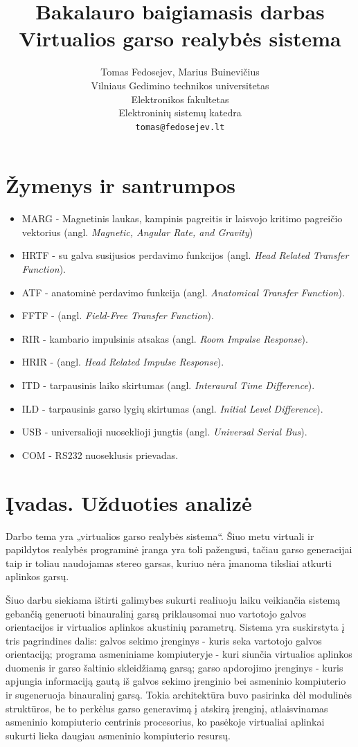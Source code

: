 \documentclass[]{vgtuef}
\author{Tomas Fedosejev, Marius Buinevičius\\Vilniaus Gedimino technikos
  universitetas\\Elektronikos fakultetas\\Elektroninių sistemų
  katedra\\\texttt{tomas@fedosejev.lt}}
\title{Bakalauro baigiamasis darbas\\Virtualios garso realybės sistema}
\begin{document}
\setcounter{page}{7}
\onehalfspacing

\tableofcontents


\section*{Žymenys ir santrumpos}

\begin{itemize}
\item MARG - Magnetinis laukas, kampinis pagreitis ir laisvojo kritimo pagreičio vektorius (angl. \textit{Magnetic, Angular Rate, and Gravity})
\item HRTF - su galva susijusios perdavimo funkcijos (angl. \textit{Head Related Transfer Function}).
\item ATF - anatominė perdavimo funkcija (angl. \textit{Anatomical Transfer Function}).
\item FFTF - (angl. \textit{Field-Free Transfer Function}).
\item RIR - kambario impulsinis atsakas (angl. \textit{Room Impulse Response}).
\item HRIR - (angl. \textit{Head Related Impulse Response}).
\item ITD - tarpausinis laiko skirtumas (angl. \textit{Interaural Time Difference}).
\item ILD - tarpausinis garso lygių skirtumas (angl. \textit{Initial Level Difference}).
\item USB - universalioji nuoseklioji jungtis (angl. \textit{Universal Serial Bus}).
\item COM - RS232 nuoseklusis prievadas.

\end{itemize}

\section{Įvadas. Užduoties analizė}

Darbo tema yra „virtualios garso realybės sistema“. Šiuo metu virtuali ir papildytos realybės programinė įranga yra toli pažengusi, tačiau garso generacijai taip ir toliau naudojamas stereo garsas, kuriuo nėra įmanoma tiksliai atkurti aplinkos garsų.

Šiuo darbu siekiama ištirti galimybes sukurti realiuoju laiku veikiančia sistemą gebančią generuoti binauralinį garsą priklausomai nuo vartotojo galvos orientacijos ir virtualios aplinkos akustinių parametrų. Sistema yra suskirstyta į tris pagrindines dalis: galvos sekimo įrenginys - kuris seka vartotojo galvos orientaciją; programa asmeniniame kompiuteryje - kuri siunčia virtualios aplinkos duomenis ir garso šaltinio skleidžiamą garsą; garso apdorojimo įrenginys - kuris apjungia informaciją gautą iš galvos sekimo įrenginio bei asmeninio kompiuterio ir sugeneruoja binauralinį garsą. Tokia architektūra buvo pasirinka dėl modulinės struktūros, be to perkėlus garso generavimą į atskirą įrenginį, atlaisvinamas asmeninio kompiuterio centrinis procesorius, ko pasėkoje virtualiai aplinkai sukurti lieka daugiau asmeninio kompiuterio resursų.
\end{document}
